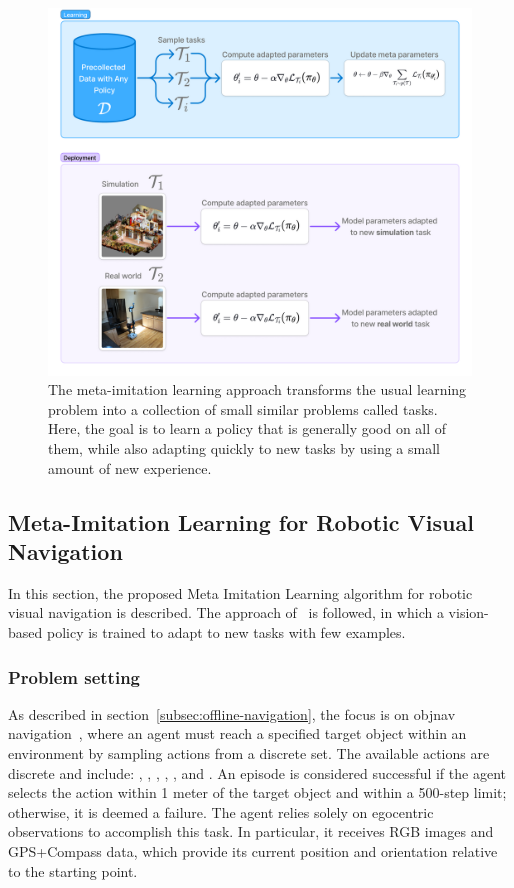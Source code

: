 \begin{figure}
    \centering
    \includegraphics[width=0.7\linewidth]{figures/metanav/graphical_abstract}
    \caption{
        The meta-imitation learning approach transforms the usual learning problem into a collection of small similar problems called tasks.
        Here, the goal is to learn a policy that is generally good on all of them, while also adapting quickly to new tasks by using a small amount of new experience.
    }
    \label{fig:abstract_metanav}
\end{figure}

\subsection{Meta-Imitation Learning for Robotic Visual Navigation}\label{subsec:meta-imitation-learning-for-robotic-visual-navigation}

In this section, the proposed Meta Imitation Learning algorithm for robotic visual navigation is described.
The approach of~\cite{finnOneShotVisualImitation2017} is followed, in which a vision-based policy is trained to adapt to new tasks with few examples.

\subsubsection{Problem setting}\label{subsubsec:problem-setting}

As described in section~\ref{subsec:offline-navigation}, the focus is on \acrshort{objnav} navigation~\cite{batra2020}, where an agent must reach a specified target object within an environment by sampling actions from a discrete set.
The available actions are discrete and include: \turnleft, \turnright, \moveforward, \lookup, \lookdown, and \stopac.
An episode is considered successful if the agent selects the \stopac action within 1 meter of the target object and within a 500-step limit; otherwise, it is deemed a failure.
The agent relies solely on egocentric observations to accomplish this task.
In particular, it receives RGB images and GPS+Compass data, which provide its current position and orientation relative to the starting point.

